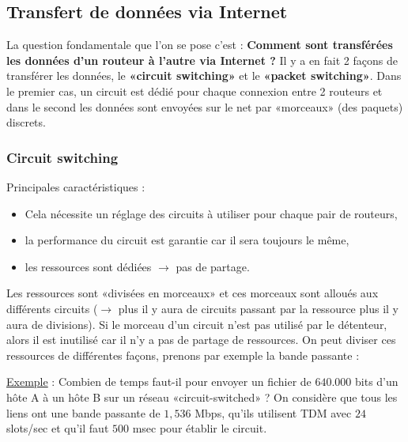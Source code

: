 \documentclass{article}
\newcommand{\ora}[1]{\textcolor{darko}{#1}}
\newcommand{\imgR}[2]{\begin{center}\texttt{[image: \#1]}\end{center}}
\newcommand{\point}[2]{\item \ora{\underline{#1}} : \textit{#2}}
\begin{document}
\subsection{Transfert de données via Internet}

La question fondamentale que l'on se pose c'est : \textbf{Comment sont transférées les données d'un routeur à 
l'autre via Internet ?} Il y a en fait 2 façons de transférer les données, le \textbf{«circuit switching»} et le
\textbf{«packet switching»}. Dans le premier cas, un circuit est dédié pour chaque connexion entre 2 routeurs et
dans le second les données sont envoyées sur le net par «morceaux» (des paquets) discrets.

\subsubsection{Circuit switching}

\noindent Principales caractéristiques :
\begin{itemize}
\item Cela nécessite un réglage des circuits à utiliser pour chaque pair de routeurs,
\item la performance du circuit est garantie car il sera toujours le même,
\item les ressources sont dédiées $\rightarrow$ pas de partage.
\end{itemize}

\noindent Les ressources sont «divisées en morceaux» et ces morceaux sont alloués aux différents circuits 
($\rightarrow$ plus il y aura de circuits passant par la ressource plus il y aura de divisions). Si le morceau 
d'un circuit n'est pas utilisé par le détenteur, alors il est inutilisé car il n'y a pas de partage de 
ressources. 
\newpage
\noindent On peut diviser ces ressources de différentes façons, prenons par exemple la bande passante : 

\noindent\underline{Exemple} : Combien de temps faut-il pour envoyer un fichier de $640.000$ bits d'un hôte A à 
un hôte B sur un réseau «circuit-switched» ? On considère que tous les liens ont une bande passante de $1,536$ 
Mbps, qu'ils utilisent TDM avec $24$ slots/sec et qu'il faut $500$ msec pour établir le circuit.
\end{document}

